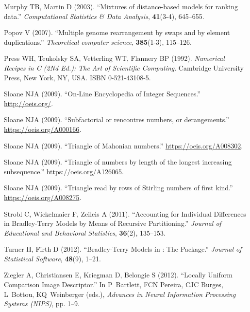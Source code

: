 \documentclass[article,nojss]{jss}
\begin{document}
\begin{thebibliography}{44}
Murphy TB, Martin D (2003).
\newblock \enquote{{Mixtures of distance-based models for ranking data}.}
\newblock \emph{Computational Statistics \& Data Analysis}, \textbf{41}(3-4),
  645--655.

Popov V (2007).
\newblock \enquote{{Multiple genome rearrangement by swaps and by element
  duplications}.}
\newblock \emph{Theoretical computer science}, \textbf{385}(1-3), 115--126.

Press WH, Teukolsky SA, Vetterling WT, Flannery BP (1992).
\newblock \emph{{Numerical Recipes in C (2Nd Ed.): The Art of Scientific
  Computing}}.
\newblock Cambridge University Press, New York, NY, USA.
\newblock ISBN 0-521-43108-5.

Sloane NJA (2009{}).
\newblock \enquote{{On-Line Encyclopedia of Integer Sequences}.}
\newblock \urlprefix\url{http://oeis.org/}.

Sloane NJA (2009{}).
\newblock \enquote{{Subfactorial or rencontres numbers, or derangements}.}
\newblock \urlprefix\url{https://oeis.org/A000166}.

Sloane NJA (2009{}).
\newblock \enquote{{Triangle of Mahonian numbers}.}
\newblock \urlprefix\url{https://oeis.org/A008302}.

Sloane NJA (2009{}).
\newblock \enquote{{Triangle of numbers by length of the longest increasing
  subsequence}.}
\newblock \urlprefix\url{https://oeis.org/A126065}.

Sloane NJA (2009{}).
\newblock \enquote{{Triangle read by rows of Stirling numbers of first kind}.}
\newblock \urlprefix\url{https://oeis.org/A008275}.

Strobl C, Wickelmaier F, Zeileis A (2011).
\newblock \enquote{{Accounting for Individual Differences in Bradley-Terry
  Models by Means of Recursive Partitioning}.}
\newblock \emph{Journal of Educational and Behavioral Statistics},
  \textbf{36}(2), 135--153.

Turner H, Firth D (2012).
\newblock \enquote{{Bradley-Terry Models in : The
   Package}.}
\newblock \emph{Journal of Statistical Software}, \textbf{48}(9), 1--21.

Ziegler A, Christiansen E, Kriegman D, Belongie S (2012).
\newblock \enquote{{Locally Uniform Comparison Image Descriptor}.}
\newblock In P~Bartlett, FCN Pereira, CJC Burges, L~Bottou, KQ~Weinberger
  (eds.), \emph{Advances in Neural Information Processing Systems (NIPS)}, pp.
  1--9.

\end{thebibliography}
\end{document}
